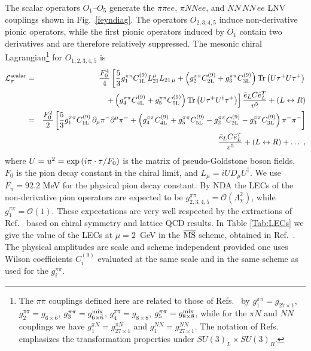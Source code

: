 \documentclass[letterpaper,11pt]{article}
\newcommand{\vL}{\ensuremath{\mathcal{L}}}
\newcommand{\bea}{\begin{eqnarray}}
\newcommand{\eea}{\end{eqnarray}}
\newcommand{\nn}{\nonumber}
\begin{document}
The scalar operators $O_{1}$--$O_5$ generate the $\pi\pi ee $, $\pi N\!N e e$, and $N\!N\, N\!N\,ee$ LNV couplings shown in Fig.~\ref{feyndiag}.
The operators $O_{2,3,4,5}$ induce non-derivative pionic operators, while the first pionic operators induced by $O_{1}$ contain two derivatives and are therefore relatively suppressed.
The mesonic chiral Lagrangian\footnote{
The $\pi\pi$ couplings defined here are related to those of Refs.\ \cite{Cirigliano:2017ymo,Cirigliano:2017djv,Pastore:2017ofx} by
$g^{\pi\pi}_1 = g_{27 \times 1}$, $g^{\pi\pi}_2 = g_{6\times \bar 6}$, $g^{\pi\pi}_3 = g_{6\times \bar 6}^{\rm mix}$,
$g_4^{\pi\pi} = g_{8\times 8}$, $g_5^{\pi\pi} = g^{\rm mix}_{8\times 8}$, while for the  $\pi N$ and $NN$ couplings
we have $g^{\pi N}_1 = g^{\pi N}_{27 \times 1}$ and $g^{N N}_1 = g^{N N}_{27 \times 1}$.  The notation of Refs.\ \cite{Cirigliano:2017ymo,Cirigliano:2017djv,Pastore:2017ofx}
emphasizes the transformation properties under $SU(3)_L \times  SU(3)_R$.} for $O_{1,2,3,4,5}^{}$ is 
\bea\label{eq:dim9pipi}
\vL^{\rm scalar}_\pi &=&\frac{F_0^4}{4}\left[
\frac{5}{3}g^{\pi\pi}_{1} C_{\rm 1L}^{(9)} L_{21}^\mu L_{21\,\mu}
+\left(g^{\pi\pi}_{2}C_{\rm 2L}^{(9)} + g^{\pi\pi}_{3} C_{\rm 3L}^{(9)}\right) {\rm Tr}\left( U\tau^+U\tau^+\right)\right.\nn\\
&&\left.+
\left(g^{\pi\pi}_{4}C_{\rm 4L}^{(9)}+g_{5}^{\pi\pi}C_{\rm 5L }^{(9)}\right) {\rm Tr}\left( U\tau^+U^\dagger\tau^+\right)
\right]\frac{\bar e_L  C\bar e^T_L}{v^5}+(L\leftrightarrow R)\nn\\
&= &\frac{F_0^2}{2}\left[
\frac{5}{3}g^{\pi\pi}_{1} C^{(9)}_{\rm 1 L}  \,  \partial_\mu \pi^- \partial^\mu \pi^-   
+ \left( g^{\pi\pi}_{4} C^{(9)}_{\rm 4 L}  + g^{\pi\pi}_{5}  C^{(9)}_{\rm 5 L}-g^{\pi\pi}_{2} C^{(9)}_{\rm 2 L}  - g^{\pi\pi}_{3} C^{(9)}_{\rm 3 L}\right)  \pi^- \pi^- 
\right]\nn \\ & & 
\frac{\bar e_L  C\bar e^T_L}{v^5}+(L\leftrightarrow R)+\dots\,\,,\eea
where $U=u^2={\rm exp}\left(i \pi\cdot \tau/F_0\right)$ is the matrix of pseudo-Goldstone boson fields, $F_0$ is the pion decay constant in the chiral limit, and $L_{\mu} = iUD_\mu U^\dagger$. 
We use $F_\pi =92.2$ MeV for the physical pion decay constant.
By NDA the LECs  of the non-derivative pion operators are expected to be $g^{\pi\pi}_{2,3,4,5}  = \mathcal O(\Lambda^2_\chi)$,
while $g^{\pi\pi}_{1} = \mathcal O(1)$. These expectations are very well respected by the extractions of Ref.\ \cite{Nicholson:2016byl,Cirigliano:2017ymo,Nicholson:2018mwc} 
based on chiral symmetry and lattice QCD results. 
In  Table \ref{Tab:LECs} we give the value of the LECs at $\mu = 2$~GeV  in the $\overline{\rm MS}$ scheme, obtained in Ref.\ \cite{Nicholson:2018mwc}.
The physical amplitudes are scale and scheme independent provided one uses Wilson coefficients $C^{(9)}_i$   
evaluated at the same scale and in the same scheme as used for the $g_i^{\pi \pi}$.
\end{document}
